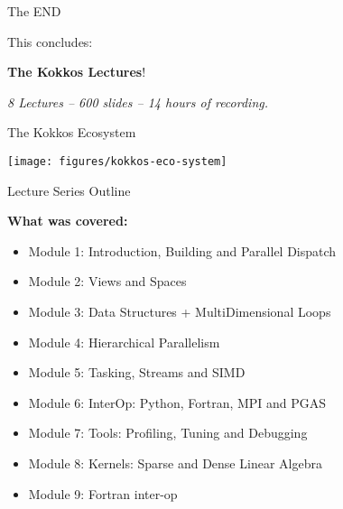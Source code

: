 \begin{frame}
{\Huge The END}

\vspace{10pt}
\begin{center}
	{\Large This concludes:}

	\vspace{20pt}
	{\Huge \textbf{The Kokkos Lectures}!}

	\vspace{20pt}
	\textit{8 Lectures -- 600 slides -- 14 hours of recording.}
\end{center}
\end{frame}

\begin{frame}[fragile]{The Kokkos Ecosystem}
  \begin{center}
    \texttt{[image: figures/kokkos-eco-system]}
  \end{center}
\end{frame}

\begin{frame}[fragile]{Lecture Series Outline}

\textbf{What was covered:}

\begin{itemize}
        \item Module 1: Introduction, Building and Parallel Dispatch
        \item Module 2: Views and Spaces
        \item Module 3: Data Structures + MultiDimensional Loops
        \item Module 4: Hierarchical Parallelism
        \item Module 5: Tasking, Streams and SIMD
        \item Module 6: InterOp: Python, Fortran, MPI and PGAS
        \item Module 7: Tools: Profiling, Tuning and Debugging
        \item Module 8: Kernels: Sparse and Dense Linear Algebra
        \item Module 9: Fortran inter-op
\end{itemize}

\end{frame}

